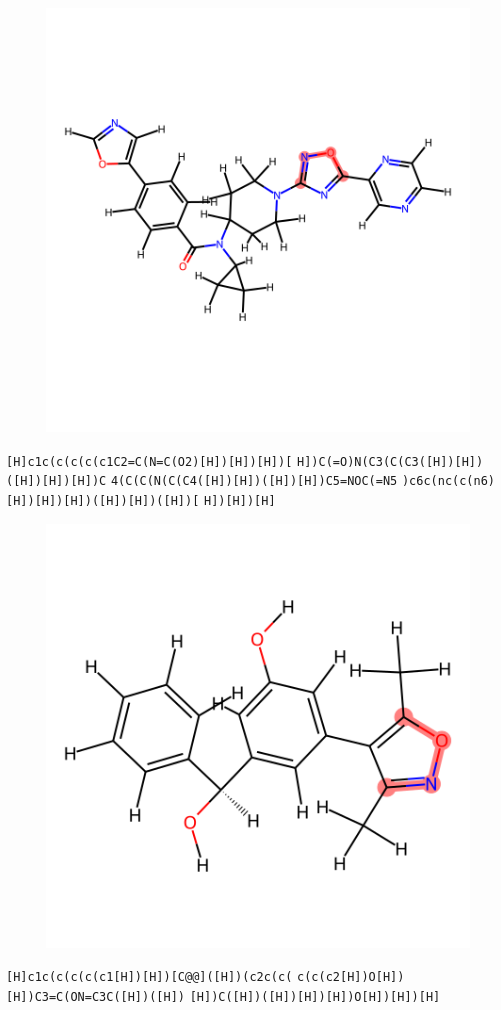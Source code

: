 \documentclass{article}
\begin{document}
\begin{figure}[ht]
\centering
    \includegraphics{mol78.png}
\end{figure}
\verb|[H]c1c(c(c(c(c1C2=C(N=C(O2)[H])[H])[H])[| \verb|H])C(=O)N(C3(C(C3([H])[H])([H])[H])[H])C| \verb|4(C(C(N(C(C4([H])[H])([H])[H])C5=NOC(=N5| \verb|)c6c(nc(c(n6)[H])[H])[H])([H])[H])([H])[| \verb|H])[H])[H]|

\begin{figure}[ht]
\centering
    \includegraphics{mol79.png}
\end{figure}
\verb|[H]c1c(c(c(c(c1[H])[H])[C@@]([H])(c2c(c(| \verb|c(c(c2[H])O[H])[H])C3=C(ON=C3C([H])([H])| \verb|[H])C([H])([H])[H])[H])O[H])[H])[H]|
\end{document}
